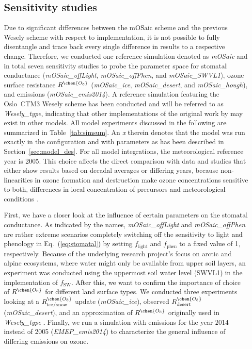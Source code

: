 \documentclass[gmd, manuscript]{copernicus}
\begin{document}
\subsection{Sensitivity studies}
\label{subsec:sens}
Due to significant differences between the mOSaic scheme and the previous Wesely scheme with respect to implementation, it is not possible to fully disentangle and trace back every single difference in results to a respective change. Therefore, we conducted one reference simulation denoted as \emph{mOSaic} and in total seven sensitivity studies to probe the parameter space for stomatal conductance (\emph{mOSaic\_offLight}, \emph{mOSaic\_offPhen}, and \emph{mOSaic\_SWVL1}), ozone surface resistance $R^\chem{O_3}$ (\emph{mOSaic\_ice}, \emph{mOSaic\_desert}, and \emph{mOSaic\_hough}), and emissions (\emph{mOSaic\_emis2014}). A reference simulation featuring the Oslo~CTM3 Wesely scheme has been conducted and will be referred to as \emph{Wesely\_type}, indicating that other implementations of the original work by \citet{AE:Wesely1989} may exist in other models.
All model experiments discussed in the following are summarized in Table~\ref{tab:simsum}. An \emph{x} therein denotes that the model was run exactly in the configuration and with parameters as has been described in Section~\ref{sec:model_des}.
For all model integrations, the meteorological reference year is 2005. This choice affects the direct comparison with data and studies that either show results based on decadal averages or differing years, because non-linearities in ozone formation and destruction make ozone concentrations sensitive to both, differences in local concentration of precursors and meteorological conditions \citep{JGR:Jin2013}.

First, we have a closer look at the influence of certain parameters on the stomatal conductance. As indicated by the names, \emph{mOSaic\_offLight} and \emph{mOSaic\_offPhen} are rather extreme scenarios completely switching off the sensitivity to light and phenology in Eq.~(\ref{eq:stomatal}) by setting $f_\text{light}$ and $f_\text{phen}$ to a fixed value of 1, respectively. Because of the underlying research project's focus on arctic and alpine ecosystems, where water might only be available from upper soil layers, an experiment was conducted using the uppermost soil water level (SWVL1) in the implementation of $f_\text{SW}$. 
After this, we want to confirm the importance of choice of $R^\chem{O_3}$ for different land surface types. We conducted three experiments looking at a $R^\chem{O_3}_\text{ice/snow}$ update \citep{ACP:Helmig2007} (\emph{mOSaic\_ice}), observed $R^\chem{O_3}_\text{desert}$ \citep{AE:Gusten1995} (\emph{mOSaic\_desert}), and an approximation of $R^\chem{O_3}$ originally used in \emph{Wesely\_type} \citep{AE:Wesely1989, JGR:Hough1991}.
Finally, we run a simulation with emissions for the year 2014 instead of 2005 (\emph{EMEP\_emis2014}) to characterize the general influence of differing emissions on ozone.  
\end{document}
